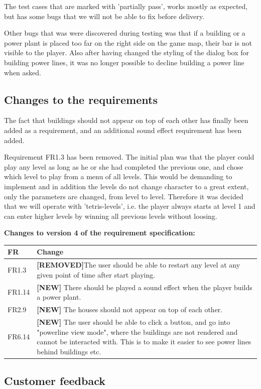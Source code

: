 	The test cases that are marked with 'partially pass', works mostly as expected, but has some bugs 
	that we will not be able to fix before delivery.

	Other bugs that was were discovered during testing was that if a building or a power plant is placed 
	too far on the right side on the game map, their bar is not visible to the player. Also after having 
	changed the styling of the dialog box for building power lines, it was no longer possible to decline 
	building a power line when asked.

\subsection{Changes to the requirements}

	The fact that buildings should not appear on top of each other has finally been added as a requirement, and an additional sound effect requirement has been added.

	Requirement FR1.3 has been removed. The initial plan was that the player could play any level as long as he or she had completed the previous one, and chose which level to play from a menu of all levels. This would be demanding to implement and in addition the levels do not change character to a great extent, only the parameters are changed, from level to level. Therefore it was decided that we will operate with 'tetris-levels', i.e. the player always starts at level 1 and can enter higher levels by winning all previous levels without loosing. 

	{\bf Changes to version 4 of the requirement specification:} \\
	\begin{tabular}{| p{1.5cm} | p{12cm} |}
		\hline
		\rowcolor{lightgray}
		{\bf FR} & {\bf Change} \\ \hline
		FR1.3 & {\bf \color{red}[REMOVED]}The user should be able to restart any level at any given point of time after start playing. \\ \hline
		FR1.14 & {\bf \color{green}[NEW]} There should be played a sound effect when the player builds a power plant. \\ \hline
		FR2.9 & {\bf \color{green}[NEW]} The houses should not appear on top of each other. \\ \hline
		FR6.14 & {\bf \color{green}[NEW]} The user should be able to click a button, and go into "powerline view mode", where the buildings are not rendered and cannot be interacted with. This is to make it easier to see power lines behind buildings etc. \\ \hline
	\end{tabular}

\subsection{Customer feedback}

	
